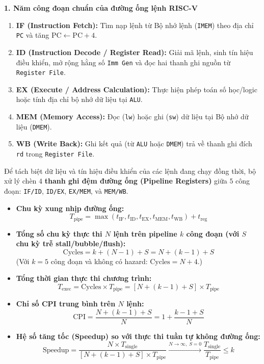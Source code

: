 \textbf{1. Năm công đoạn chuẩn của đường ống lệnh RISC-V}
\begin{enumerate}
    \item \textbf{IF (Instruction Fetch):} Tìm nạp lệnh từ Bộ nhớ lệnh (\texttt{IMEM}) theo địa chỉ \texttt{PC} và tăng $\text{PC} \leftarrow \text{PC} + 4$.
    \item \textbf{ID (Instruction Decode / Register Read):} Giải mã lệnh, sinh tín hiệu điều khiển, mở rộng hằng số \texttt{Imm Gen} và đọc hai thanh ghi nguồn từ \texttt{Register File}.
    \item \textbf{EX (Execute / Address Calculation):} Thực hiện phép toán số học/logic hoặc tính địa chỉ bộ nhớ dữ liệu tại \texttt{ALU}.
    \item \textbf{MEM (Memory Access):} Đọc (\texttt{lw}) hoặc ghi (\texttt{sw}) dữ liệu tại Bộ nhớ dữ liệu (\texttt{DMEM}).
    \item \textbf{WB (Write Back):} Ghi kết quả (từ \texttt{ALU} hoặc \texttt{DMEM}) trả về thanh ghi đích \texttt{rd} trong \texttt{Register File}.
\end{enumerate}

Để tách biệt dữ liệu và tín hiệu điều khiển của các lệnh đang chạy đồng thời, bộ xử lý chèn $4$ \textbf{thanh ghi đệm đường ống (Pipeline Registers)} giữa $5$ công đoạn: \texttt{IF/ID}, \texttt{ID/EX}, \texttt{EX/MEM}, và \texttt{MEM/WB}.

\begin{tcolorbox}[bwbox, title={Các công thức trọng tâm tính toán hiệu năng Đường ống lệnh (Pipeline)}]
\begin{itemize}
    \item \textbf{Chu kỳ xung nhịp đường ống:}
    $$T_{\text{pipe}} = \max(t_{\text{IF}}, t_{\text{ID}}, t_{\text{EX}}, t_{\text{MEM}}, t_{\text{WB}}) + t_{\text{reg}}$$
    \item \textbf{Tổng số chu kỳ thực thi $N$ lệnh trên pipeline $k$ công đoạn (với $S$ chu kỳ trễ stall/bubble/flush):}
    $$\text{Cycles} = k + (N - 1) + S = N + (k - 1) + S$$
    (Với $k = 5$ công đoạn và không có hazard: $\text{Cycles} = N + 4$.)
    \item \textbf{Tổng thời gian thực thi chương trình:}
    $$T_{\text{exec}} = \text{Cycles} \times T_{\text{pipe}} = [N + (k - 1) + S] \times T_{\text{pipe}}$$
    \item \textbf{Chỉ số CPI trung bình trên $N$ lệnh:}
    $$\text{CPI} = \frac{N + (k - 1) + S}{N} = 1 + \frac{k - 1 + S}{N}$$
    \item \textbf{Hệ số tăng tốc (Speedup) so với thực thi tuần tự không đường ống:}
    $$\text{Speedup} = \frac{N \times T_{\text{single}}}{[N + (k - 1) + S] \times T_{\text{pipe}}} \xrightarrow{N \to \infty,\; S = 0} \frac{T_{\text{single}}}{T_{\text{pipe}}} \le k$$
\end{itemize}
\end{tcolorbox}

